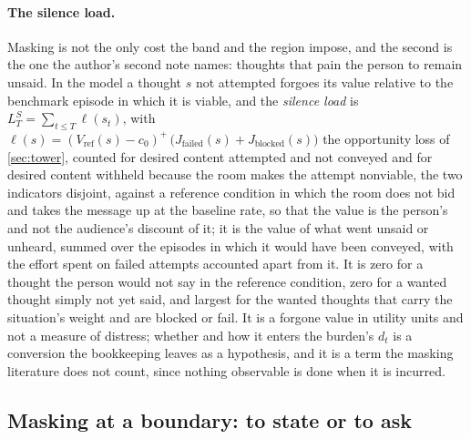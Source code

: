 \paragraph{The silence load.} Masking is not the only cost the band and the region impose, and the second is the one the author's second note names: thoughts that pain the person to remain unsaid. In the model a thought $s$ not attempted forgoes its value relative to the benchmark episode in which it is viable, and the \emph{silence load} is $L^{S}_T = \sum_{t \le T} \ell(s_t)$, with $\ell(s) = (V_{\mathrm{ref}}(s) - c_0)^{+}\,\big(J_{\mathrm{failed}}(s) + J_{\mathrm{blocked}}(s)\big)$ the opportunity loss of \autoref{sec:tower}, counted for desired content attempted and not conveyed and for desired content withheld because the room makes the attempt nonviable, the two indicators disjoint, against a reference condition in which the room does not bid and takes the message up at the baseline rate, so that the value is the person's and not the audience's discount of it; it is the value of what went unsaid or unheard, summed over the episodes in which it would have been conveyed, with the effort spent on failed attempts accounted apart from it. It is zero for a thought the person would not say in the reference condition, zero for a wanted thought simply not yet said, and largest for the wanted thoughts that carry the situation's weight and are blocked or fail. It is a forgone value in utility units and not a measure of distress; whether and how it enters the burden's $d_t$ is a conversion the bookkeeping leaves as a hypothesis, and it is a term the masking literature does not count, since nothing observable is done when it is incurred.

\subsection{Masking at a boundary: to state or to ask}\label{sec:boundary}

